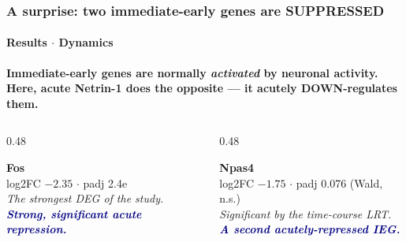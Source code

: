 \documentclass[aspectratio=169,11pt]{beamer}
\newcommand{\hi}[1]{\textcolor{navy}{\textbf{#1}}}
\begin{document}
\begin{frame}
  \frametitle{A surprise: two immediate-early genes are SUPPRESSED}\framesubtitle{Results $\cdot$ Dynamics}
  \colorbox{abg}{\parbox{0.97\textwidth}{\vskip2pt\color{navy}\bfseries
    Immediate-early genes are normally \emph{activated} by neuronal activity. Here,
    acute Netrin-1 does the opposite --- it acutely DOWN-regulates them.\vskip2pt}}
  \vskip10pt
  \begin{columns}[T]
    \begin{column}{0.48\textwidth}
      \colorbox{lbg}{\parbox{\textwidth}{\vskip3pt
        {\color{reddn}\Large\bfseries Fos}\\[3pt]
        log2FC $-2.35$ $\cdot$ padj 2.4e\\
        \itshape The strongest DEG of the study.\\[4pt]
        \hi{Strong, significant acute repression.}\vskip3pt}}
    \end{column}
    \begin{column}{0.48\textwidth}
      \colorbox{lbg}{\parbox{\textwidth}{\vskip3pt
        {\color{reddn}\Large\bfseries Npas4}\\[3pt]
        log2FC $-1.75$ $\cdot$ padj 0.076 (Wald, n.s.)\\
        \itshape Significant by the time-course LRT.\\[4pt]
        \hi{A second acutely-repressed IEG.}\vskip3pt}}
    \end{column}
  \end{columns}
\end{frame}
\end{document}
